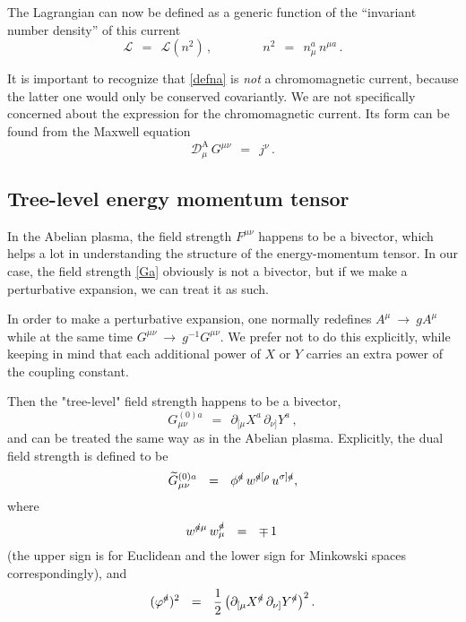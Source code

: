 \documentclass[epsfig,12pt]{article}
\def\beq{\begin{equation}}
\def\eeq{\end{equation}}
\newcommand{\p}{\partial}
\newcommand{\wt}{\widetilde}
\newcommand{\mc}[1]{\mathcal{#1}}
\newcommand{\md}{\mathcal{D}}
\begin{document}
	The Lagrangian can now be defined as a generic function of the ``invariant number density'' of this current
\beq
	\mc{L}    ~~=~~    \mc{L}(n^2)\,,
        \qquad\qquad
        n^2 ~~=~~ n_\mu^a\, n^{\mu a}\,.
\eeq

	It is important to recognize that \eqref{defna} is \emph{not} a chromomagnetic current,
        because the latter one would only be conserved covariantly.
	We are not specifically concerned about the expression for the chromomagnetic current.
	Its form can be found from the Maxwell equation
\beq
	\md^\text{A}_\mu\, G^{\mu\nu}     ~~=~~    j^\nu\,.
\eeq




\subsection{Tree-level energy momentum tensor}
	In the Abelian plasma, the field strength $ F^{\mu\nu} $ happens to be a bivector,
	which helps a lot in understanding the structure of the energy-momentum tensor.
	In our case, the field strength \eqref{Ga} obviously is not a bivector, but
	if we make a perturbative expansion, we can treat it as such.
	
	In order to make a perturbative expansion, one normally redefines $ A^\mu ~\to~ g A^\mu $
	while at the same time $ G^{\mu\nu} ~\to~ g^{-1} G^{\mu\nu} $.
	We prefer not to do this explicitly, while keeping in mind that each additional power of $ X $ or $ Y $
	carries an extra power of the coupling constant.

	Then the "tree-level" field strength happens to be a bivector,
\beq
	G_{\mu\nu}^{(0)a}    ~~=~~    \p_{[\mu} X^a\, \p_{\nu]} Y^a\,,
\eeq
	and can be treated the same way as in the Abelian plasma.
	Explicitly, the dual field strength is defined to be
\beq
	\wt{G}{}_{\mu\nu}^{(0)a}    ~~=~~    \phi^\slashed{a}\, w^{\slashed{a}[\rho}\, u^{\sigma]\slashed{a}},
\eeq
	where
\beq
	w^{\slashed{a}\mu}\, w^{\slashed{a}}_\mu    ~~=~~    \mp\,1\,
\eeq
	(the upper sign is for Euclidean and the lower sign for Minkowski spaces correspondingly),
	and
\beq
	( \varphi^\slashed{a} )^2    ~~=~~    \frac{1}{2}\, \big( \p_{[\mu} X^\slashed{a}\, \p_{\nu]} Y^\slashed{a} \big)^2\,.
\eeq
\end{document}
